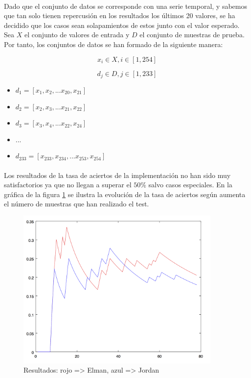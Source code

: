 \documentclass[10pt, a4paper,spanish]{article}
\begin{document}
		\paragraph{}
		Dado que el conjunto de datos se corresponde con una serie temporal, y sabemos que tan solo tienen repercusión en los resultados los últimos 20 valores, se ha decidido que los casos sean solapamientos de estos junto con el valor esperado. Sea $X$ el conjunto de valores de entrada y $D$ el conjunto de muestras de prueba. Por tanto, los conjuntos de datos se han formado de la siguiente manera:

		\begin{equation}
			x_i \in X, i \in [1,254]
		\end{equation}

		\begin{equation}
			d_j \in D, j \in [1,233]
		\end{equation}

		\begin{itemize}
			\item $d_{1} = [x_{1},x_{2},...x_{20},x_{21}]$
			\item $d_{2} = [x_{2},x_{3},...x_{21},x_{22}]$
			\item $d_{3} = [x_{3},x_{4},...x_{22},x_{24}]$
			\item $...$
			\item $d_{233} = [x_{233},x_{234},...x_{253},x_{254}]$
		\end{itemize}


		\paragraph{}
		Los resultados de la tasa de aciertos de la implementación no han sido muy satisfactorios ya que no llegan a superar el $50\%$ salvo casos especiales. En la gráfica de la figura \ref{plot:results} se ilustra la evolución de la tasa de aciertos según aumenta el número de muestras que han realizado el test.


		\begin{figure}[H]
			\begin{center}
				\includegraphics[width=0.9\textwidth]{chart}
				\caption{Resultados: rojo => Elman, azul => Jordan}
				\label{plot:results}
			\end{center}
		\end{figure}
\end{document}
